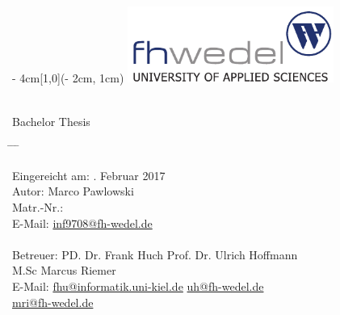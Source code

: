 
\begin{titlepage}
  \vspace*{20ex}
  \begin{textblock*}{\paperwidth - 4cm}[1,0](\paperwidth - 2cm, 1cm)
    \centering
    \includegraphics[height=2.5cm]{images/fhlogo}
    \hfill
  \end{textblock*}
  \begin{center}
    \sffamily{}
    {\Large\docsubtitle} \\[4ex]
    {Bachelor Thesis}
  \end{center}
  \vspace*{10ex}
  \begin{tabbing}
    \hspace{8em} \= \hspace{14em} \= \hspace{8em} \= \kill

    Eingereicht am: . Februar 2017 \\[5ex]
    Autor: \> Marco Pawlowski \\
    Matr.-Nr.:  \\
    E-Mail: \> \href{mailto:inf9708@fh-wedel.de}{inf9708@fh-wedel.de} \\

    \\
    Betreuer: \> PD. Dr. Frank Huch  \> Prof. Dr. Ulrich Hoffmann  \\ \> M.Sc Marcus Riemer \\
    E-Mail: \> \href{mailto:fhu@informatik.uni-kiel.de}{fhu@informatik.uni-kiel.de} \> \href{mailto:uh@fh-wedel.de}{uh@fh-wedel.de} \\ \> \href{mailto:mri@fh-wedel.de}{mri@fh-wedel.de}
  \end{tabbing}
  \vfill
\end{titlepage}

\restoregeometry                 %

\cleardoublepage

